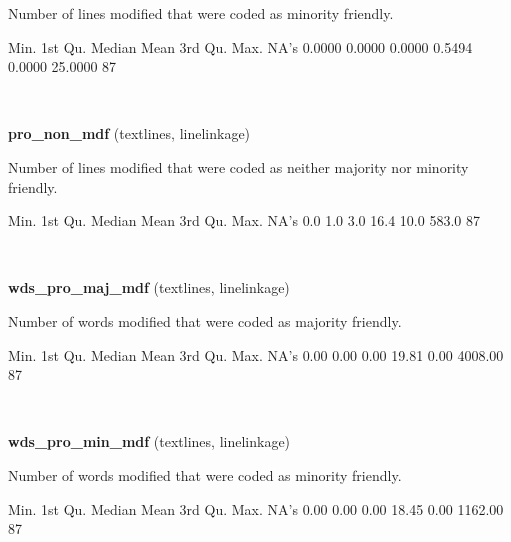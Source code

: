 \documentclass[]{article}
\newenvironment{Shaded}{\begin{snugshade}}{\end{snugshade}}
\newcommand{\StringTok}[1]{\textcolor[rgb]{0.31,0.60,0.02}{{#1}}}
\newcommand{\NormalTok}[1]{{#1}}
\begin{document}
Number of lines modified that were coded as minority friendly.

\begin{Shaded}
\begin{Highlighting}[]
   \NormalTok{Min. 1st Qu.  Median    Mean 3rd Qu.    Max.    NA}\StringTok{'s }
\StringTok{ 0.0000  0.0000  0.0000  0.5494  0.0000 25.0000      87 }
\end{Highlighting}
\end{Shaded}

~

\vspace{1em}

\textbf{pro\_non\_mdf} (textlines, linelinkage)

Number of lines modified that were coded as neither majority nor
minority friendly.

\begin{Shaded}
\begin{Highlighting}[]
   \NormalTok{Min. 1st Qu.  Median    Mean 3rd Qu.    Max.    NA}\StringTok{'s }
\StringTok{    0.0     1.0     3.0    16.4    10.0   583.0      87 }
\end{Highlighting}
\end{Shaded}

~

\vspace{1em}

\textbf{wds\_pro\_maj\_mdf} (textlines, linelinkage)

Number of words modified that were coded as majority friendly.

\begin{Shaded}
\begin{Highlighting}[]
   \NormalTok{Min. 1st Qu.  Median    Mean 3rd Qu.    Max.    NA}\StringTok{'s }
\StringTok{   0.00    0.00    0.00   19.81    0.00 4008.00      87 }
\end{Highlighting}
\end{Shaded}

~

\vspace{1em}

\textbf{wds\_pro\_min\_mdf} (textlines, linelinkage)

Number of words modified that were coded as minority friendly.

\begin{Shaded}
\begin{Highlighting}[]
   \NormalTok{Min. 1st Qu.  Median    Mean 3rd Qu.    Max.    NA}\StringTok{'s }
\StringTok{   0.00    0.00    0.00   18.45    0.00 1162.00      87 }
\end{Highlighting}
\end{Shaded}
\end{document}
